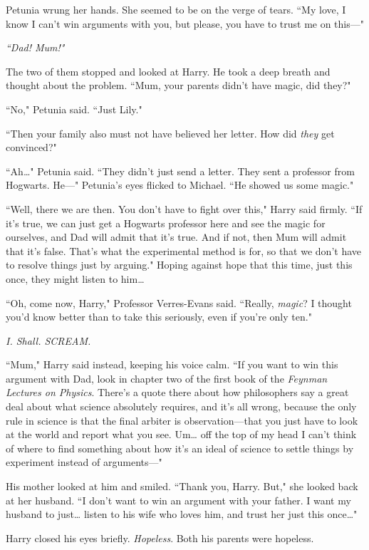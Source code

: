 Petunia wrung her hands. She seemed to be on the verge
of tears. ``My love, I know I can't win arguments with you,
but please, you have to trust me on this---"

\emph{``Dad! Mum!"}

The two of them stopped and looked at Harry. He took a
deep breath and thought about the problem. ``Mum, your
parents didn't have magic, did they?"

``No," Petunia said. ``Just Lily."

``Then your family also must not have believed her letter.
How did \emph{they} get convinced?"

``Ah{\ldots}" Petunia said. ``They didn't just send a letter. They
sent a professor from Hogwarts. He---" Petunia's eyes
flicked to Michael. ``He showed us some magic."

``Well, there we are then. You don't have to fight over
this," Harry said firmly. ``If it's true, we can just get a
Hogwarts professor here and see the magic for ourselves,
and Dad will admit that it's true. And if not, then Mum will
admit that it's false. That's what the experimental method
is for, so that we don't have to resolve things just by
arguing." Hoping against hope that this time, just this once,
they might listen to him{\ldots}

``Oh, come now, Harry," Professor Verres-Evans said.
``Really, \emph{magic}? I thought you'd know better than to take
this seriously, even if you're only ten."

\emph{I. Shall. SCREAM.}

``Mum," Harry said instead, keeping his voice calm. ``If you
want to win this argument with Dad, look in chapter two
of the first book of the \emph{Feynman Lectures on Physics}.
There's a quote there about how philosophers say a great
deal about what science absolutely requires, and it's all
wrong, because the only rule in science is that the final
arbiter is observation---that you just have to look at the
world and report what you see. Um{\ldots} off the top of my
head I can't think of where to find something about how
it's an ideal of science to settle things by experiment
instead of arguments---"

His mother looked at him and smiled. ``Thank you, Harry.
But," she looked back at her husband. ``I don't want to
win an argument with your father. I want my husband to
just{\ldots} listen to his wife who loves him, and trust her just
this once{\ldots}"

Harry closed his eyes briefly. \emph{Hopeless}. Both his parents
were hopeless.

